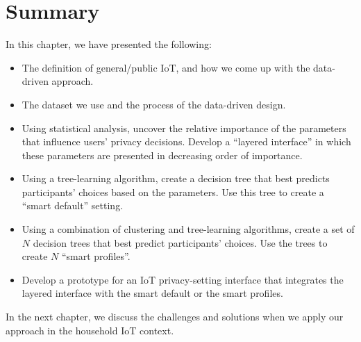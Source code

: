 \section{Summary}
In this chapter, we have presented the following:

\begin{itemize}
    \item The definition of general/public IoT, and how we come up with the data-driven approach.
    \item The dataset we use and the process of the data-driven design.
	\item Using statistical analysis, uncover the relative importance of the parameters that influence users' privacy decisions. Develop a ``layered interface'' in which these parameters are presented in decreasing order of importance.
	\item Using a tree-learning algorithm, create a decision tree that best predicts participants' choices based on the parameters. Use this tree to create a ``smart default'' setting.
	\item Using a combination of clustering and tree-learning algorithms, create a set of $N$ decision trees that best predict participants' choices. Use the trees to create $N$ ``smart profiles''.
	\item Develop a prototype for an IoT privacy-setting interface that integrates the layered interface with the smart default or the smart profiles.
\end{itemize}

In the next chapter, we discuss the challenges and solutions when we apply our approach in the household IoT context. 
